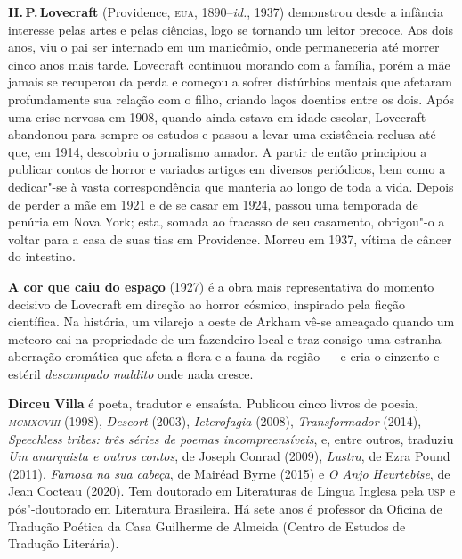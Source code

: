 \textbf{H.\,P.\,Lovecraft} (Providence, \textsc{eua}, 1890--\textit{id.}, 1937) demonstrou desde a infância interesse pelas artes e pelas ciências, logo se tornando um leitor precoce. Aos dois anos, viu o pai ser internado em um manicômio, onde permaneceria até morrer cinco anos mais tarde. Lovecraft continuou morando com a família, porém a mãe jamais se recuperou da perda e começou a sofrer distúrbios mentais que afetaram profundamente sua relação com o filho, criando laços doentios entre os dois. Após uma crise nervosa em 1908, quando ainda estava em idade escolar, Lovecraft abandonou para sempre os estudos e passou a levar uma existência reclusa até que, em 1914, descobriu o jornalismo amador. A partir de então principiou a publicar contos de horror e variados artigos em diversos periódicos, bem como a dedicar"-se à vasta correspondência que manteria ao longo de toda a vida. Depois de perder a mãe em 1921 e de se casar em 1924, passou uma temporada de penúria em Nova York; esta, somada ao fracasso de seu casamento, obrigou"-o a voltar para a casa de suas tias em Providence. Morreu em 1937, vítima de câncer do intestino.

\pagebreak

\textbf{A cor que caiu do espaço} (1927) é a obra mais representativa do momento decisivo de Lovecraft em direção ao horror cósmico, inspirado pela ficção científica. Na história, um vilarejo a oeste de Arkham vê-se ameaçado quando um meteoro cai na propriedade de um fazendeiro local e traz consigo uma estranha aberração cromática que afeta a flora e a fauna da região --- e cria o cinzento e estéril \textit{descampado maldito} onde nada cresce.

\textbf{Dirceu Villa} é poeta, tradutor e ensaísta. Publicou cinco livros de poesia, \textit{\textsc{mcmxcviii}} (1998), \textit{Descort} (2003), \textit{Icterofagia} (2008), \textit{Transformador} (2014), \textit{Speechless tribes: três séries de poemas incompreensíveis}, e, entre outros, traduziu \textit{Um anarquista e outros contos}, de Joseph Conrad (2009), \textit{Lustra}, de Ezra Pound (2011), \textit{Famosa na sua cabeça}, de Mairéad Byrne (2015) e \textit{O Anjo Heurtebise}, de Jean Cocteau (2020). Tem doutorado em Literaturas de Língua Inglesa pela \textsc{usp} e pós"-doutorado em Literatura Brasileira. Há sete anos é professor da Oficina de Tradução Poética da Casa Guilherme de Almeida (Centro de Estudos de Tradução Literária).

\blankpage



